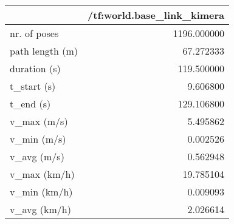 \begin{tabular}{lr}
\toprule
{} &  /tf:world.base\_link\_kimera \\
\midrule
nr. of poses    &                 1196.000000 \\
path length (m) &                   67.272333 \\
duration (s)    &                  119.500000 \\
t\_start (s)     &                    9.606800 \\
t\_end (s)       &                  129.106800 \\
v\_max (m/s)     &                    5.495862 \\
v\_min (m/s)     &                    0.002526 \\
v\_avg (m/s)     &                    0.562948 \\
v\_max (km/h)    &                   19.785104 \\
v\_min (km/h)    &                    0.009093 \\
v\_avg (km/h)    &                    2.026614 \\
\bottomrule
\end{tabular}
